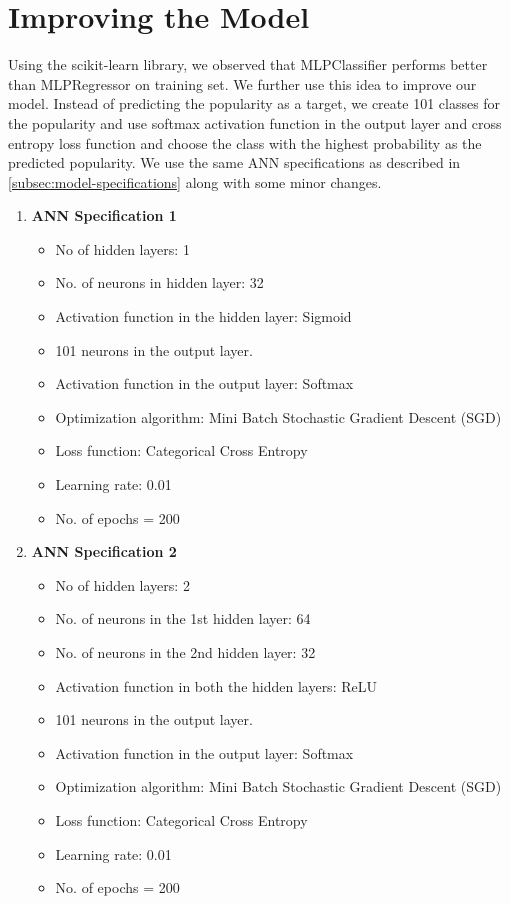 \documentclass[12pt]{article}
\begin{document}
\section{Improving the Model} \label{sec:improving-model}
Using the scikit-learn library, we observed that MLPClassifier performs better than MLPRegressor on training set. We further use this idea to improve our model. Instead of predicting the popularity as a target, we create 101 classes for the popularity and use softmax activation function in the output layer and cross entropy loss function and choose the class with the highest probability as the predicted popularity. We use the same ANN specifications as described in \ref{subsec:model-specifications} along with some minor changes.
\begin{enumerate}
	\item \textbf{ANN Specification 1}
	\begin{itemize}
		\item No of hidden layers: 1
		\item No. of neurons in hidden layer: 32
		\item Activation function in the hidden layer: Sigmoid
		\item 101 neurons in the output layer.
		\item Activation function in the output layer: Softmax
		\item Optimization algorithm: Mini Batch Stochastic Gradient Descent (SGD)
		\item Loss function: Categorical Cross Entropy
		\item Learning rate: 0.01
		\item No. of epochs = 200
	\end{itemize}
	\item \textbf{ANN Specification 2}
	\begin{itemize}
		\item No of hidden layers: 2
		\item No. of neurons in the 1st hidden layer: 64
		\item No. of neurons in the 2nd hidden layer: 32
		\item Activation function in both the hidden layers: ReLU
		\item 101 neurons in the output layer.
		\item Activation function in the output layer: Softmax
		\item Optimization algorithm: Mini Batch Stochastic Gradient Descent (SGD)
		\item Loss function: Categorical Cross Entropy
		\item Learning rate: 0.01
		\item No. of epochs = 200
	\end{itemize}

\end{enumerate}
\end{document}
